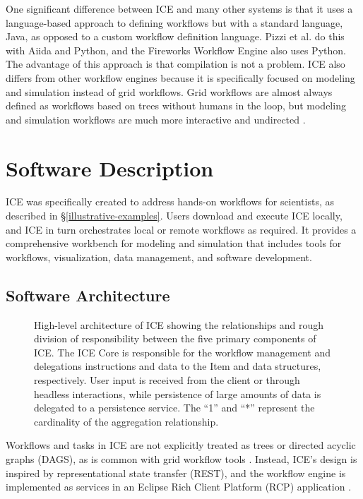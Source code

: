One significant difference between ICE and many other systems is that it uses a
language-based approach to defining workflows but with a standard language,
Java, as opposed to a custom workflow definition language. Pizzi et al. do this
with Aiida and Python, and the Fireworks Workflow Engine also uses Python. The
advantage of this approach is that compilation is not a problem. ICE also
differs from other workflow engines because it is specifically focused on
modeling and simulation instead of grid workflows. Grid workflows are almost
always defined as workflows based on trees without humans in the loop, but
modeling and simulation workflows are much more interactive and undirected
\cite{billings_toward_2017}.

\section{Software Description}\label{software-description}

ICE was specifically created to address hands-on workflows for scientists, as
described in \S \ref{illustrative-examples}. Users download and execute ICE
locally, and ICE in turn orchestrates local or remote workflows as required. It
provides a comprehensive workbench for modeling and simulation that includes
tools for workflows, visualization, data management, and software development.

\subsection{Software Architecture}\label{software-architecture}

\begin{figure}[htbp] \centering
{}
\caption{High-level architecture of ICE showing the relationships and rough
division of responsibility between the five primary components of ICE. The ICE
Core is responsible for the workflow management and delegations instructions
and data to the Item and data structures, respectively. User input is received
from the client or through headless interactions, while persistence of large
amounts of data is delegated to a persistence service. The ``1'' and ``*''
represent the cardinality of the aggregation relationship.}
\label{highlevel-arch}
\end{figure}

Workflows and tasks in ICE are not explicitly treated as trees or
directed acyclic graphs (DAGS), as is common with grid workflow tools
\cite{yu_taxonomy_2005}. Instead, ICE's design is inspired by representational
state transfer (REST), and the workflow engine is implemented as services in an
Eclipse Rich Client Platform (RCP) application
\cite{fielding_architectural_2000} \cite{mcaffer_eclipse_2010}.

